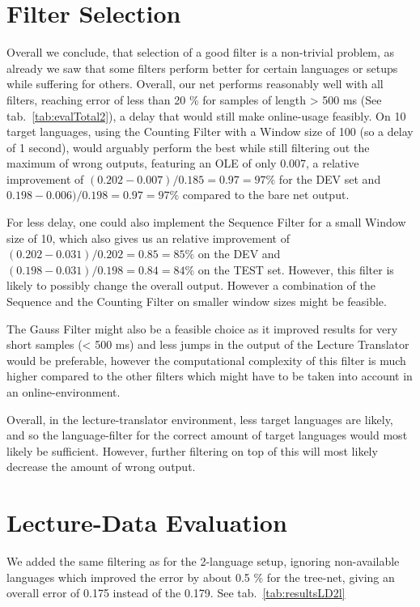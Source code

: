 \section{Filter Selection}
\label{sec:eval:filterSelection}

Overall we conclude, that selection of a good filter is  a non-trivial problem, as already we saw that some filters perform better for certain languages or setups while suffering for others. Overall, our net performs reasonably well with all filters, reaching error of less than 20 \% for samples of length > 500 ms (See tab.~\ref{tab:evalTotal2}), a delay that would still make online-usage feasibly. On 10 target languages, using the Counting Filter with a Window size of 100 (so a delay of 1 second), would arguably perform the best while still filtering out the maximum of wrong outputs, featuring an OLE of only 0.007, a relative improvement of \((0.202-0.007) / 0.185 = 0.97 = 97 \% \) for the DEV set and \( 0.198- 0.006)/ 0.198 = 0.97 = 97\% \) compared to the bare net output.

For less delay, one could also implement the Sequence Filter for a small Window size of 10, which also gives us an relative improvement of \((0.202-0.031) / 0.202 = 0.85 = 85 \%\) on the DEV and \((0.198 - 0.031) / 0.198 = 0.84 = 84\% \) on the TEST set. However, this filter is likely to possibly change the overall output. However a combination of the Sequence and the Counting Filter on smaller window sizes might be feasible.

The Gauss Filter might also be a feasible choice as it improved results for very short samples (< 500 ms) and less jumps in the output of the Lecture Translator would be preferable, however the computational complexity of this filter is much higher compared to the other filters which might have to be taken into account in an online-environment.

Overall, in the lecture-translator environment, less target languages are likely, and so the language-filter for the correct amount of target languages would most likely be sufficient. However, further filtering on top of this will most likely decrease the amount of wrong output.

\section{Lecture-Data Evaluation}
\label{sec:eval:LD}

We added the same filtering as for the 2-language setup, ignoring non-available languages which improved the error by about 0.5 \% for the tree-net, giving an overall error of 0.175 instead of the 0.179. See tab.~\ref{tab:resultsLD2l}


